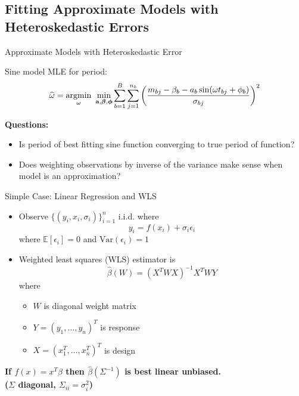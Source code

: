 \documentclass[12pt]{beamer}
\newcommand{\argmin}[1]{\underset{#1}{\operatorname{argmin}}\text{ }}
\newcommand{\Var}{\text{Var}}
\newcommand{\E}{\mathbb{E}}
\newcommand{\V}[1]{{\bm{\mathbf{\MakeLowercase{#1}}}}} %
\begin{document}
\subsection{Fitting Approximate Models with Heteroskedastic Errors}

\begin{frame}{Approximate Models with Heteroskedastic Error}

  Sine model MLE for period:
  \begin{equation*}
    \widehat{\omega} = \argmin{\omega} \min_{\V{a},\V{\beta},\V{\phi}} \sum_{b=1}^B \sum_{j=1}^{n_b} \left(\frac{m_{bj} - \beta_{b} - a_b\sin(\omega t_{bj} + \phi_b)}{\sigma_{bj}}\right)^2
  \end{equation*}
  
  
  

  \textbf{Questions:}
  \begin{itemize}
  \item Is period of best fitting sine function converging to true period of function?\\
  \item Does weighting observations by inverse of the variance make sense when model is an approximation?
  \end{itemize}
  
\end{frame}

\begin{frame}{Simple Case: Linear Regression and WLS}
\begin{itemize}
\item Observe $\{(y_i,x_i,\sigma_i)\}_{i=1}^n$ i.i.d. where
  \begin{equation*}
    y_i = f(x_i) + \sigma_i\epsilon_i 
  \end{equation*}
  where $\E[\epsilon_i] = 0$  and $\Var(\epsilon_i) = 1$
\item Weighted least squares (WLS) estimator is
  \begin{equation*}
    \widehat{\beta}(W) = (X^TWX)^{-1}X^TWY
  \end{equation*}
  where
  \begin{itemize}
    \item $W$ is diagonal weight matrix
    \item $Y = (y_1,\ldots,y_n)^T$ is response
    \item $X = (x_1^T,\ldots,x_n^T)^T$ is design
  \end{itemize}
\end{itemize}

\begin{center}
\textbf{If $f(x) = x^T\beta$ then $\widehat{\beta}(\Sigma^{-1})$ is best linear unbiased.\\ ($\Sigma$ diagonal, $\Sigma_{ii} = \sigma_i^2$)}
\end{center}
\end{frame}
\end{document}
